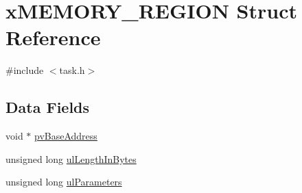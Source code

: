 \hypertarget{structx_m_e_m_o_r_y___r_e_g_i_o_n}{\section{x\-M\-E\-M\-O\-R\-Y\-\_\-\-R\-E\-G\-I\-O\-N Struct Reference}
\label{structx_m_e_m_o_r_y___r_e_g_i_o_n}
}


{\ttfamily \#include $<$task.\-h$>$}

\subsection*{Data Fields}
\begin{DoxyCompactItemize}
\item 
void $\ast$ \hyperlink{structx_m_e_m_o_r_y___r_e_g_i_o_n_a5c540d9e8ba79b50b9600f7225d41268}{pv\-Base\-Address}
\item 
unsigned long \hyperlink{structx_m_e_m_o_r_y___r_e_g_i_o_n_a3bab560a2b429ca0430ec91ce759c9f8}{ul\-Length\-In\-Bytes}
\item 
unsigned long \hyperlink{structx_m_e_m_o_r_y___r_e_g_i_o_n_a9c337bc748fd9f212e8256d53d0cbec4}{ul\-Parameters}
\end{DoxyCompactItemize}


